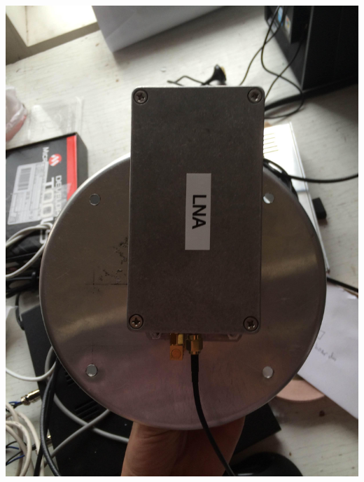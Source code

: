 \documentclass[11pt]{article} %
\begin{document}
\begin{center}
\includegraphics[scale=0.08]{feed/19.jpeg}
\end{center}
\end{document}

